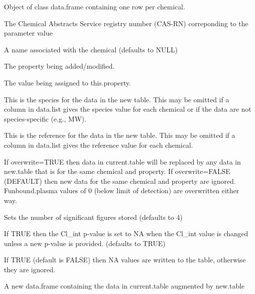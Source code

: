 \documentclass[a4paper]{book}
\begin{document}
\begin{Arguments}
\begin{ldescription}
\item[\code{this.table}] Object of class data.frame containing one row per chemical.

\item[\code{this.CAS}] The Chemical Abstracts Service registry number (CAS-RN)
correponding to the parameter value

\item[\code{compound.name}] A name associated with the chemical (defaults to NULL)

\item[\code{this.property}] The property being added/modified.

\item[\code{value}] The value being assigned to this.property.

\item[\code{species}] This is the species for the data in the new table. This may
be omitted if a column in data.list gives the species value for each
chemical or if the data are not species-specific (e.g., MW).

\item[\code{reference}] This is the reference for the data in the new table. This
may be omitted if a column in data.list gives the reference value for each
chemical.

\item[\code{overwrite}] If overwrite=TRUE then data in current.table will be
replaced by any data in new.table that is for the same chemical and
property. If overwrite=FALSE (DEFAULT) then new data for the same chemical
and property are ignored.  Funbound.plasma values of 0 (below limit of
detection) are overwritten either way.

\item[\code{sig.fig}] Sets the number of significant figures stored (defaults to 4)

\item[\code{clint.pvalue.overwrite}] If TRUE then the Cl\_int p-value is set to NA 
when the Cl\_int value is changed unless a new p-value is provided. (defaults
to TRUE)

\item[\code{allow.na}] If TRUE (default is FALSE) then NA values are written to the
table, otherwise they are ignored.
\end{ldescription}
\end{Arguments}
%
\begin{Value}
\begin{ldescription}
\item[\code{data.frame}] A new data.frame containing the data in
current.table augmented by new.table
\end{ldescription}
\end{Value}
\end{document}
